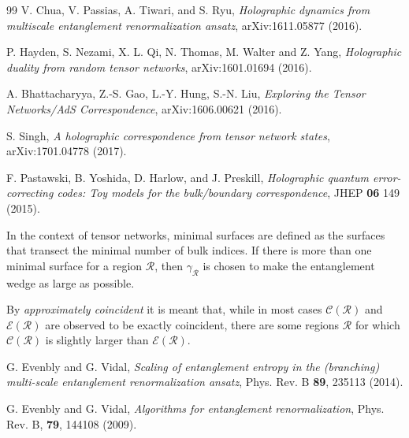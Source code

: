 \documentclass[aps,prl,twocolumn,showpacs,superscriptaddress,floatfix,10pt]{revtex4-1}
\def\E{{\mathcal E}}
\def\C{{\mathcal C}}
\def\R{{\mathcal R}}
\begin{document}
\begin{thebibliography}{99}
V. Chua, V. Passias, A. Tiwari, and S. Ryu, {\it Holographic dynamics from multiscale entanglement renormalization ansatz}, arXiv:1611.05877 (2016).

P. Hayden, S. Nezami, X. L. Qi, N. Thomas, M. Walter and Z. Yang, {\it Holographic duality from random tensor networks}, arXiv:1601.01694 (2016).

A. Bhattacharyya, Z.-S. Gao, L.-Y. Hung, S.-N. Liu, {\it Exploring the Tensor Networks/AdS Correspondence}, arXiv:1606.00621 (2016).


S. Singh, {\it A holographic correspondence from tensor network states}, arXiv:1701.04778 (2017).

F. Pastawski, B. Yoshida, D. Harlow, and J. Preskill, {\it Holographic quantum error-correcting codes: Toy models for the bulk/boundary correspondence}, JHEP {\bf 06} 149 (2015).

In the context of tensor networks, minimal surfaces are defined as the surfaces that transect the minimal number of bulk indices. If there is more than one minimal surface for a region $\R$, then $\gamma_{\R}$ is chosen to make the entanglement wedge as large as possible.

By \emph{approximately coincident} it is meant that, while in most cases $\C(\R)$ and $\E(\R)$ are observed to be exactly coincident, there are some regions $\R$ for which $\C(\R)$ is slightly larger than $\E(\R)$.

G. Evenbly and G. Vidal, {\it Scaling of entanglement entropy in the (branching) multi-scale entanglement renormalization ansatz}, Phys. Rev. B {\bf 89}, 235113 (2014).

G. Evenbly and G. Vidal, {\it Algorithms for entanglement renormalization}, Phys. Rev. B, {\bf 79}, 144108 (2009).

%
%
%
%


\end{thebibliography}
\end{document}
